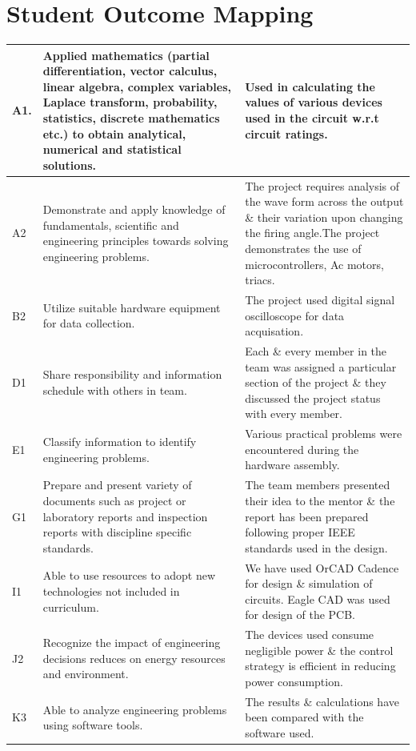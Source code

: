         \section{Student Outcome Mapping}
        	\begin{table}[h!]
        		\begin{tabular}{|m{0.75cm}|m{2.75in}|m{2.75in}|}\hline
        		A1.&Applied mathematics (partial differentiation, vector calculus, linear algebra, complex variables, Laplace transform, probability, statistics, discrete mathematics etc.) to obtain analytical, numerical and statistical solutions.& Used in calculating the values of various devices used in the circuit w.r.t circuit ratings.\\\hline
        		A2 & Demonstrate and apply knowledge of fundamentals, scientific and engineering principles towards solving engineering problems.& The project requires analysis of the wave form across the output \& their variation upon changing the firing angle.The project demonstrates the use of microcontrollers, Ac motors, triacs.\\\hline
        		B2 & Utilize suitable hardware equipment for data collection.& The project used digital signal oscilloscope for data acquisation. \\\hline
          		D1 & Share responsibility and information schedule with others in team.& Each \& every member in the team was assigned a particular section of the project \& they discussed the project status with every member.\\\hline
        		E1 & Classify information to identify engineering problems.& Various practical problems were encountered during the hardware assembly.\\\hline
        		G1 & Prepare and present variety of documents such as project or laboratory reports and inspection reports with discipline specific standards.& The team members presented their idea to the mentor \& the report has been prepared following proper IEEE standards used in the design. \\\hline
        		I1 & Able to use resources to adopt new technologies not included in curriculum.& We have used OrCAD Cadence for design \& simulation of circuits. Eagle CAD was used for design of the PCB.\\\hline
        		J2 & Recognize the impact of engineering decisions reduces on energy resources and environment.& The devices used consume negligible power \& the control strategy is efficient in reducing power consumption.\\\hline
        		K3 & Able to analyze engineering problems using software tools.& The results \& calculations have been compared with the software used. \\\hline
        		\end{tabular}
        	\end{table}
    